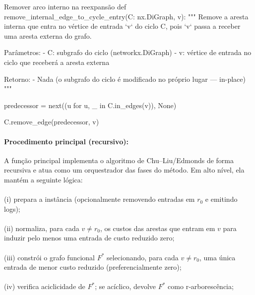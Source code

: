 \documentclass[12pt,a4paper]{article}
\def\emph#1{#1}%
\begin{document}
\begin{pybox}{Remover arco interno na reexpansão}
def remove_internal_edge_to_cycle_entry(C: nx.DiGraph, v):
    """
    Remove a aresta interna que entra no vértice de entrada `v` do ciclo C,
    pois `v` passa a receber uma aresta externa do grafo.

    Parâmetros:
        - C: subgrafo do ciclo (networkx.DiGraph)
        - v: vértice de entrada no ciclo que receberá a aresta externa

    Retorno:
        - Nada (o subgrafo do ciclo é modificado no próprio lugar — in-place)
    """

    predecessor = next((u for u, _ in C.in_edges(v)), None)

    C.remove_edge(predecessor, v)
\end{pybox}

\paragraph{Procedimento principal (recursivo):}
A função principal implementa o algoritmo de Chu–Liu/Edmonds de forma recursiva e atua como um orquestrador das fases do método. Em alto nível, ela mantém a seguinte lógica:

\paragraph{}
(i) prepara a instância (opcionalmente removendo entradas em \(r_0\) e emitindo logs); 

\paragraph{}
(ii) normaliza, para cada \(v\neq r_0\), os custos das arestas que \emph{entram} em \(v\) para induzir pelo menos uma entrada de custo reduzido zero; 

\paragraph{}
(iii) constrói o grafo funcional \(F^*\) selecionando, para cada \(v\neq r_0\), uma única entrada de menor custo reduzido (preferencialmente zero); 

\paragraph{}
(iv) verifica aciclicidade de \(F^*\); se acíclico, devolve \(F^*\) como r‑arborescência;
\end{document}
